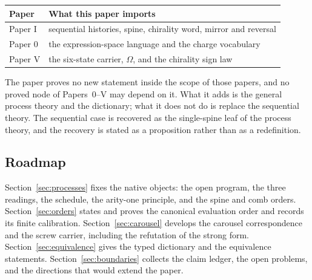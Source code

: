 \begin{center}
\begin{tabular}{@{}ll@{}}
\toprule
Paper & What this paper imports \\
\midrule
Paper I & sequential histories, spine, chirality word, mirror and reversal \\
Paper 0 & the expression-space language and the charge vocabulary \\
Paper V & the six-state carrier, $\Omega$, and the chirality sign law \\
\bottomrule
\end{tabular}
\end{center}

The paper proves no new statement inside the scope of those papers, and no proved
node of Papers~0--V may depend on it.  What it adds is the general process theory
and the dictionary; what it does not do is replace the sequential theory.  The
sequential case is recovered as the single-spine leaf of the process theory, and the
recovery is stated as a proposition rather than as a redefinition.

\subsection{Roadmap}

Section~\ref{sec:processes} fixes the native objects: the open program, the three
readings, the schedule, the arity-one principle, and the spine and comb orders.
Section~\ref{sec:orders} states and proves the canonical evaluation order and records
its finite calibration.  Section~\ref{sec:carousel} develops the carousel
correspondence and the screw carrier, including the refutation of the strong form.
Section~\ref{sec:equivalence} gives the typed dictionary and the equivalence
statements.  Section~\ref{sec:boundaries} collects the claim ledger, the open
problems, and the directions that would extend the paper.
